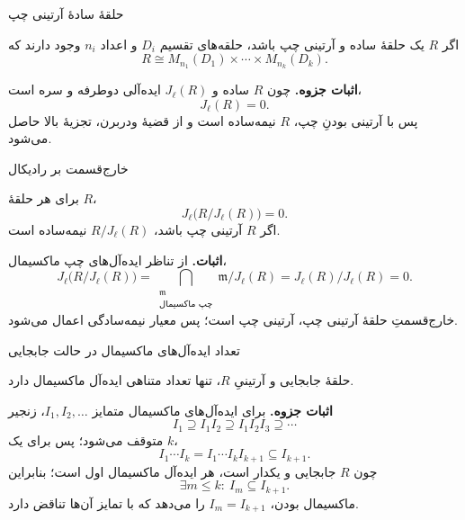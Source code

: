 \begin{frame}[t]{حلقهٔ سادهٔ آرتینی چپ}
\label{lec15:simple-artinian-matrix}
\begin{theorem}
اگر \(R\) یک حلقهٔ ساده و آرتینی چپ باشد، حلقه‌های تقسیم \(D_i\) و اعداد \(n_i\) وجود دارند که
\[
 R\cong M_{n_1}(D_1)\times\cdots\times M_{n_k}(D_k).
\]
\end{theorem}
\textbf{اثبات جزوه.} چون \(R\) ساده و \(J_\ell(R)\) ایده‌آلی دوطرفه و سره است،
\[
 J_\ell(R)=0.
\]
پس با آرتینی بودنِ چپ، \(R\) نیمه‌ساده است و از قضیهٔ ودربرن، تجزیهٔ بالا حاصل می‌شود.
\end{frame}

\begin{frame}[t]{خارج‌قسمت بر رادیکال}
\label{lec15:radical-quotient}
\begin{corollary}
برای هر حلقهٔ \(R\)،
\[
 J_\ell\bigl(R/J_\ell(R)\bigr)=0.
\]
اگر \(R\) آرتینی چپ باشد، \(R/J_\ell(R)\) نیمه‌ساده است.
\end{corollary}
\textbf{اثبات.} از تناظر ایده‌آل‌های چپ ماکسیمال،
\[
 J_\ell\bigl(R/J_\ell(R)\bigr)
 =\bigcap_{\substack{\mathfrak m\\\text{چپ ماکسیمال}}}\mathfrak m/J_\ell(R)
 =J_\ell(R)/J_\ell(R)=0.
\]
خارج‌قسمتِ حلقهٔ آرتینی چپ، آرتینی چپ است؛ پس معیار نیمه‌سادگی اعمال می‌شود.
\end{frame}

\begin{frame}[t]{تعداد ایده‌آل‌های ماکسیمال در حالت جابجایی}
\label{lec15:finitely-many-maximals}
\begin{theorem}
حلقهٔ جابجایی و آرتینیِ \(R\)، تنها تعداد متناهی ایده‌آل ماکسیمال دارد.
\end{theorem}
\textbf{اثبات جزوه.} برای ایده‌آل‌های ماکسیمال متمایز \(I_1,I_2,\ldots\)، زنجیر
\[
 I_1\supseteq I_1I_2\supseteq I_1I_2I_3\supseteq\cdots
\]
متوقف می‌شود؛ پس برای یک \(k\)،
\[
 I_1\cdots I_k=I_1\cdots I_k I_{k+1}\subseteq I_{k+1}.
\]
چون \(R\) جابجایی و یکدار است، هر ایده‌آل ماکسیمال اول است؛ بنابراین
\[
 \exists m\leq k:\ I_m\subseteq I_{k+1}.
\]
ماکسیمال بودن، \(I_m=I_{k+1}\) را می‌دهد که با تمایز آن‌ها تناقض دارد.
\end{frame}

